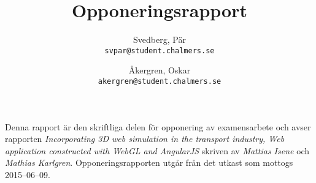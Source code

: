 \documentclass[a4paper, 11pt]{article}
\author{
    Svedberg, Pär \\ \texttt{svpar@student.chalmers.se}
    \and
    Åkergren, Oskar \\ \texttt{akergren@student.chalmers.se}
}
\title{\vspace{-3cm}Opponeringsrapport}
\begin{document}
\maketitle
\vspace{-0.5cm}Denna rapport är den skriftliga delen för opponering av examensarbete och avser rapporten \emph{Incorporating 3D web simulation in the transport industry, Web application constructed with WebGL and AngularJS} skriven av \emph{Mattias Isene} och \emph{Mathias Karlgren}. Opponeringsrapporten utgår från det utkast som mottogs 2015--06--09.

\end{document}
